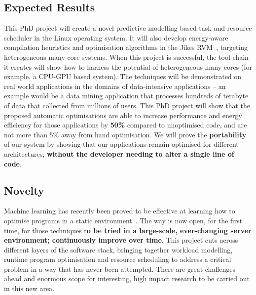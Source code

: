 \subsection{Expected Results}
\begin{shaded}
This PhD project will create a novel predictive modelling based task and resource scheduler in the Linux operating system. It will also develop energy-aware compilation heuristics and optimisation algorithms in the Jikes RVM~\cite{JRVM}, targeting heterogeneous many-core systems.
When this project is successful, the tool-chain it creates will show how to harness the potential of heterogeneous many-cores (for example, a CPU-GPU based system). The techniques will be demonstrated on real world applications in the domains of data-intensive applications -- an example would be a data mining application that processes hundreds of terabyte of data that collected from millions of users. This PhD project will show that the proposed automatic optimisations are able to increase performance and energy efficiency for those applications by \textbf{50\%} compared to unoptimised code, and are not more than 5\% away from hand optimisation. We will prove the \textbf{portability} of our system by showing that our applications remain optimised for different architectures, \textbf{without the developer needing to alter a single line of code}.
\end{shaded}

\subsection{Novelty}
Machine learning has recently been proved to be effective at learning how to optimise programs in a static environment~\cite{wangf,wangs}. The way is now open, for the first time, for those techniques t\textbf{o be tried in a large-scale, ever-changing server environment; continuously improve over time}. This project cuts across different layers of the software stack, bringing together workload modelling, runtime program optimisation and resource scheduling to address a critical problem in a way that has never been attempted. There are great challenges ahead and enormous scope for interesting, high impact research to be carried out in this new area.
